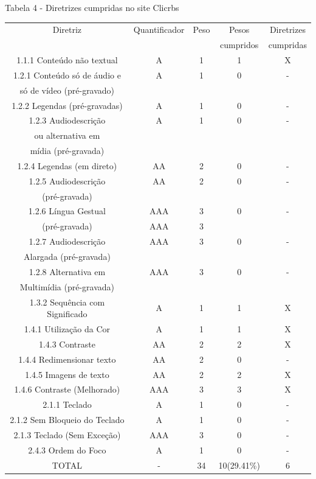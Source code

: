 \documentclass[a4paper]{article}
\begin{document}
\begin{titlepage}
Tabela 4 - Diretrizes cumpridas no site Clicrbs\\[-1cm]
\begin{center}
	\fontsize{8pt}{8pt}\selectfont	
	\begin{longtable}{|c|c|c|c|c|}
		\hline
		Diretriz & Quantificador & Peso & Pesos & Diretrizes\\
		& & & cumpridos & cumpridas\\
		\hline
		1.1.1 Conteúdo não textual & A & 1 & 1 & X \\
		\hline
		1.2.1 Conteúdo só de áudio e & A & 1 & 0 & - \\
		só de vídeo (pré-gravado) & & & & \\
		\hline
		1.2.2 Legendas (pré-gravadas) & A & 1 & 0 & - \\
		\hline
		1.2.3 Audiodescrição & A & 1 & 0 & - \\
		ou alternativa em & & & & \\
		mídia (pré-gravada) & & & & \\
		\hline
		1.2.4 Legendas (em direto) & AA & 2 & 0 & - \\
		\hline
		1.2.5 Audiodescrição & AA & 2 & 0 & - \\
		(pré-gravada) & & & & \\
		\hline
		1.2.6 Língua Gestual & AAA & 3 & 0 & - \\
		(pré-gravada) & AAA & 3 & & \\
		\hline
		1.2.7 Audiodescrição & AAA & 3 & 0 & - \\
		Alargada (pré-gravada) & & & & \\
		\hline
		1.2.8 Alternativa em & AAA & 3 & 0 & - \\
		Multimídia (pré-gravada) & & & & \\
		\hline
		1.3.2 Sequência com Significado & A & 1 & 1 & X \\
		\hline
		1.4.1 Utilização da Cor & A & 1 & 1 & X \\
		\hline
		1.4.3 Contraste & AA & 2 & 2 & X \\
		\hline
		1.4.4 Redimensionar texto & AA & 2 & 0 & - \\
		\hline
		1.4.5 Imagens de texto & AA & 2 & 2 & X \\
		\hline
		1.4.6 Contraste (Melhorado) & AAA & 3 & 3 & X \\
		\hline
		2.1.1 Teclado & A & 1 & 0 & - \\
		\hline
		2.1.2 Sem Bloqueio do Teclado & A & 1 & 0 & - \\
		\hline
		2.1.3 Teclado (Sem Exceção) & AAA & 3 & 0 & - \\
		\hline
		2.4.3 Ordem do Foco & A & 1 & 0 & - \\
		\hline
		TOTAL & - & 34 & 10(29.41\%) & 6 \\
		\hline
	\end{longtable}
\end{center}


\end{titlepage}
\end{document}
